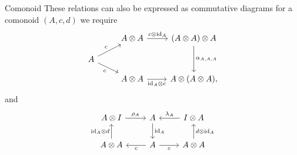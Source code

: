 \documentclass[fleqn]{NotesClass}
\DeclareMathOperator{\id}{id}
\begin{document}
\begin{dfn}{Comonoid}{}
        These relations can also be expressed as commutative diagrams for a comonoid \((A, c, d)\) we require
        \begin{equation}
            \begin{tikzcd}[row sep=small]
                & A \otimes A \arrow[r, "c \otimes \id_A"] & (A \otimes A) \otimes A \arrow[dd, "\alpha_{A,A,A}"]\\
                A \arrow[ur, "c"] \arrow[dr, "c"']\\
                & A \otimes A \arrow[r, "{\id_A} \otimes c"'] & A \otimes (A \otimes A),
            \end{tikzcd}
        \end{equation}
        and
        \begin{equation}
            \begin{tikzcd}
               A \otimes I \arrow[r, "\rho_A"] & A \arrow[d, "\id_A"] & I \otimes A \arrow[l, "\lambda_A"'] \\
               A \otimes A \arrow[u, "{\id_A} \otimes d"] & A \arrow[l, "c"] \arrow[r, "c"'] & A \otimes A \arrow[u, "d \otimes \id_A"']
            \end{tikzcd}
        \end{equation}
    \end{dfn}
    
\end{document}

